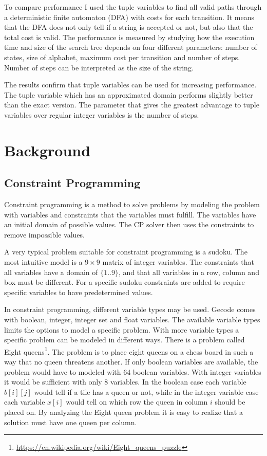 \documentclass[a4paper,11pt]{article}
\begin{document}
To compare performance I used the tuple variables to find all valid paths through a deterministic finite automaton (DFA) with costs for each transition. It means that the DFA does not only tell if a string is accepted or not, but also that the total cost is valid. The performance is measured by studying how the execution time and size of the search tree depends on four different parameters: number of states, size of alphabet, maximum cost per transition and number of steps. Number of steps can be interpreted as the size of the string.

The results confirm that tuple variables can be used for increasing performance. The tuple variable which has an approximated domain performs slightly better than the exact version. The parameter that gives the greatest advantage to tuple variables over regular integer variables is the number of steps.



\section{Background}
\subsection{Constraint Programming}

Constraint programming is a method to solve problems by modeling the problem with variables and constraints that the variables must fulfill. The variables have an initial domain of possible values. The CP solver then uses the constraints to remove impossible values. 

A very typical problem suitable for constraint programming is a sudoku. The most intuitive model is a $9\times9$ matrix of integer variables. The constraints that all variables have a domain of $\{1..9\}$, and that all variables in a row, column and box must be different. For a specific sudoku constraints are added to require specific variables to have predetermined values.

In constraint programming, different variable types may be used. Gecode comes with boolean, integer, integer set and float variables. The available variable types limits the options to model a specific problem. With more variable types a specific problem can be modeled in different ways. There is a problem called Eight queens\footnote{\url{https://en.wikipedia.org/wiki/Eight_queens_puzzle}}. The problem is to place eight queens on a chess board in such a way that no queen threatens another. If only boolean variables are available, the problem would have to modeled with 64 boolean variables. With integer variables it would be sufficient with only 8 variables. In the boolean case each variable $b[i][j]$ would tell if a tile has a queen or not, while in the integer variable case each variable $x[i]$ would tell on which row the queen in column $i$ should be placed on. By analyzing the Eight queen problem it is easy to realize that a solution must have one queen per column.
\end{document}

